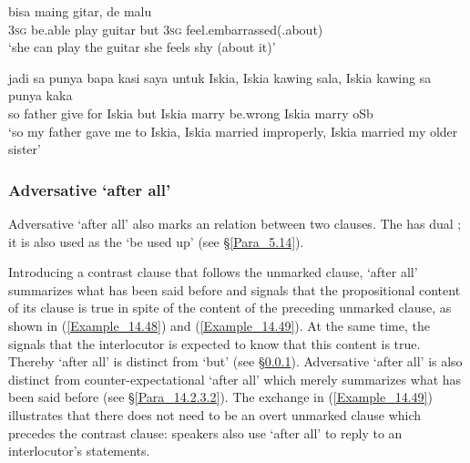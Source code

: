 \ea
\label{Example_14.46}
 {bisa} {maing} {gitar,} {} {de} {malu}\\ %
 \textsc{3sg}  be.able  play  guitar  but  \textsc{3sg}  feel.embarrassed(.about)\\
\glt ‘she can play the guitar  she feels shy (about it)’ \textstyleExampleSource{[081014-015-Cv.0008]}
\z

\ea
\label{Example_14.47}

\gll jadi  sa  punya  bapa  kasi  saya  untuk  Iskia,    Iskia kawing  sala,  Iskia  kawing  sa  punya  kaka\\  
so      father  give    for  Iskia  but  Iskia marry  be.wrong  Iskia  marry      oSb\\
\glt ‘so my father gave me to Iskia,  Iskia married improperly, Iskia married my older sister’ \textstyleExampleSource{[081006-028-CvEx.0005]}
\z

\subsubsection[Adversative habis ‘after all’]{Adversative  ‘after all’}
\label{Para_14.2.5.2}
Adversative  ‘after all’ also marks an  relation between two clauses. The  has dual ; it is also used as the    ‘be used up’ (see §\ref{Para_5.14}).



Introducing a contrast clause that follows the unmarked clause,  ‘after all’ summarizes what has been said before and signals that the propositional content of its clause is true in spite of the content of the preceding unmarked clause, as shown in (\ref{Example_14.48}) and (\ref{Example_14.49}). At the same time, the  signals that the interlocutor is expected to know that this content is true. Thereby  ‘after all’ is distinct from   ‘but’ (see §\ref{Para_14.2.5.2}). Adversative  ‘after all’ is also distinct from counter-expectational  ‘after all’ which merely summarizes what has been said before (see §\ref{Para_14.2.3.2}). The exchange in (\ref{Example_14.49}) illustrates that there does not need to be an overt unmarked clause which precedes the contrast clause: speakers also use  ‘after all’ to reply to an interlocutor’s statements.


